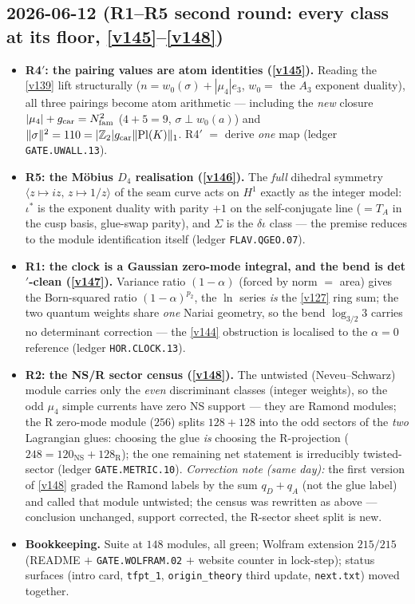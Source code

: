 \subsection*{2026-06-12 (R1--R5 second round: every class at its floor, \vref{v145}--\vref{v148})}
\begin{itemize}
\item \textbf{R4$'$: the pairing values are atom identities (\vref{v145}).} Reading the
  \vref{v139} lift structurally ($n=w_0(\sigma)+|\mu_4|e_3$, $w_0=$ the $A_3$ exponent
  duality), all three pairings become atom arithmetic --- including the \emph{new}
  closure $|\mu_4|+g_{\mathrm{car}}=N_{\mathrm{fam}}^2$ ($4{+}5{=}9$, $\sigma\perp w_0(a)$) and
  $\|\sigma\|^2=110=|\mathbb{Z}_2|g_{\mathrm{car}}\|\mathrm{Pl}(K)\|_1$. R4$'$ $=$ derive \emph{one} map
  (ledger \texttt{GATE.UWALL.13}).
\item \textbf{R5: the M\"obius $D_4$ realisation (\vref{v146}).} The \emph{full}
  dihedral symmetry $\langle z{\mapsto}iz,\,z{\mapsto}1/z\rangle$ of the seam curve acts
  on $H^1$ exactly as the integer model: $\iota^*$ is the exponent duality with parity
  $+1$ on the self-conjugate line ($=T_A$ in the cusp basis, glue-swap parity), and
  $\Sigma$ is the $\delta\iota$ class --- the premise reduces to the module
  identification itself (ledger \texttt{FLAV.QGEO.07}).
\item \textbf{R1: the clock is a Gaussian zero-mode integral, and the bend is
  det$'$-clean (\vref{v147}).} Variance ratio $(1-\alpha)$ (forced by norm $=$ area)
  gives the Born-squared ratio $(1-\alpha)^{p_2}$, the $\ln$ series \emph{is} the
  \vref{v127} ring sum; the two quantum weights share \emph{one} Nariai geometry, so the
  bend $\log_{3/2}3$ carries no determinant correction --- the \vref{v144} obstruction is
  localised to the $\alpha=0$ reference (ledger \texttt{HOR.CLOCK.13}).
\item \textbf{R2: the NS/R sector census (\vref{v148}).} The untwisted (Neveu--Schwarz)
  module carries only the \emph{even} discriminant classes (integer weights), so the odd
  $\mu_4$ simple currents have zero NS support --- they are Ramond modules; the R
  zero-mode module ($256$) splits $128{+}128$ into the odd sectors of the \emph{two}
  Lagrangian glues: choosing the glue \emph{is} choosing the R-projection
  ($248=120_{\mathrm{NS}}{+}128_{\mathrm R}$); the one remaining net statement is
  irreducibly twisted-sector (ledger \texttt{GATE.METRIC.10}). \emph{Correction note
  (same day):} the first version of \vref{v148} graded the Ramond labels by the sum
  $q_D{+}q_A$ (not the glue label) and called that module untwisted; the census was
  rewritten as above --- conclusion unchanged, support corrected, the R-sector sheet
  split is new.
\item \textbf{Bookkeeping.} Suite at $148$ modules, all green; Wolfram extension
  $215/215$ (README $+$ \texttt{GATE.WOLFRAM.02} $+$ website counter in lock-step);
  status surfaces (intro card, \texttt{tfpt\_1}, \texttt{origin\_theory} third update,
  \texttt{next.txt}) moved together.
\end{itemize}

